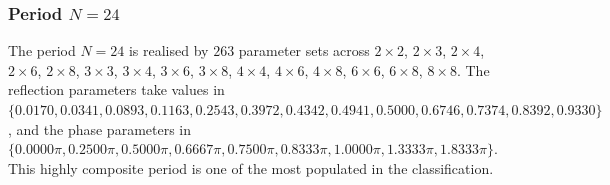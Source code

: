 \par
\subsubsection{Period $N = 24$}
The period $N=24$ is realised by $263$ parameter sets across $2\times2$, $2\times3$, $2\times4$, $2\times6$, $2\times8$, $3\times3$, $3\times4$, $3\times6$, $3\times8$, $4\times4$, $4\times6$, $4\times8$, $6\times6$, $6\times8$, $8\times8$. The reflection parameters take values in $\{0.0170, 0.0341, 0.0893, 0.1163, 0.2543, 0.3972, 0.4342, 0.4941, 0.5000, 0.6746, 0.7374, 0.8392, 0.9330\}$, and the phase parameters in $\{0.0000\pi, 0.2500\pi, 0.5000\pi, 0.6667\pi, 0.7500\pi, 0.8333\pi, 1.0000\pi, 1.3333\pi, 1.8333\pi\}$. This highly composite period is one of the most populated
in the classification.
